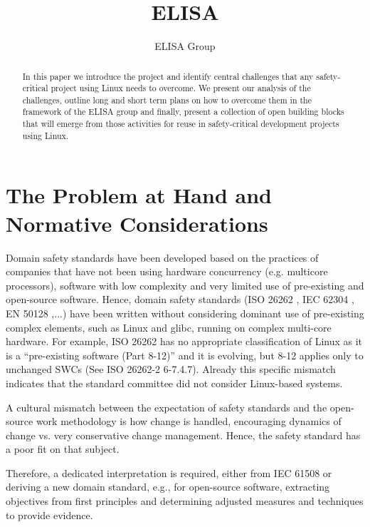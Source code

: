 \documentclass[12pt]{ElisaPaper}
\title{ELISA}
\author{ELISA Group}
\begin{document}
	
\maketitle	
\begin{abstract}
In this paper we introduce the project and identify central challenges that any safety-critical project using Linux needs to overcome.
We present our analysis of the challenges, outline long and short term plans on how to overcome them in the framework of the ELISA group and finally, present a collection of open building blocks that will emerge from those activities for reuse in safety-critical development projects using Linux.
\end{abstract}

\tableofcontents

\section{The Problem at Hand and Normative Considerations}
Domain safety standards have been developed based on the practices of companies that have not been using hardware concurrency (e.g. multicore processors), software with low complexity and very limited use of pre-existing and open-source software. 
Hence, domain safety standards (ISO 26262 \cite{ISO26262:2018}, IEC 62304 \cite{IEC62304}, EN 50128 \cite{DINEN50128},...) have been written without considering dominant use of pre-existing complex elements, such as Linux and glibc, running on complex multi-core hardware. 
For example, ISO 26262 has no appropriate classification of Linux as it is a “pre-existing software  (Part 8-12)” and it is evolving, but 8-12 applies only to unchanged SWCs (See ISO 26262-2 6-7.4.7). 
Already this specific mismatch indicates that the standard committee did not consider Linux-based systems.

A cultural mismatch between the expectation of safety standards and the open-source work methodology is how change is handled, encouraging dynamics of change vs. very conservative change management.
Hence, the safety standard has a poor fit on that subject.

Therefore, a dedicated interpretation is required, either from IEC 61508 or deriving a new domain standard, e.g., for open-source software, extracting objectives from first principles and determining adjusted measures and techniques to provide evidence.
\end{document}

